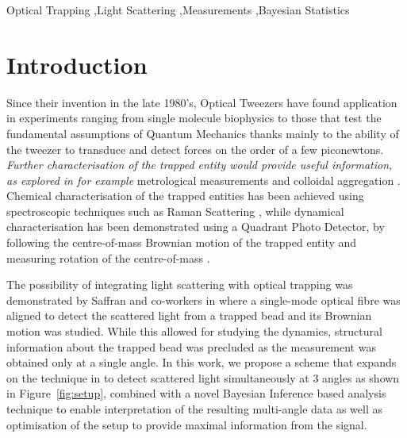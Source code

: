 \documentclass[final, 3p]{elsarticle}
\begin{document}
\begin{frontmatter}
\begin{keyword}
	Optical Trapping \sep Light Scattering \sep Measurements \sep Bayesian Statistics 
\end{keyword}

\end{frontmatter}





\section{Introduction}
\label{sec:Intro}

Since their invention in the late 1980's, Optical Tweezers have found application in experiments ranging from single molecule biophysics \cite{Bustamante2021Biophysics} to those that test the fundamental assumptions of Quantum Mechanics  \cite{yin2013large} thanks mainly to the ability of the tweezer to transduce and detect forces on the order of a few piconewtons. \textit{Further characterisation of the trapped entity would provide useful information, as explored in for example} metrological measurements \cite{arita2020coherent} and colloidal aggregation \cite{burns1990optical}. Chemical characterisation of the trapped entities has been achieved using spectroscopic techniques such as Raman Scattering \cite{gupta2014raman}, while dynamical characterisation has been demonstrated using a Quadrant Photo Detector,  by following the centre-of-mass Brownian motion of the trapped entity  \cite{friedrich2012tuning} and measuring rotation  of the centre-of-mass \cite{yifat2021facile}. 

The possibility of integrating light scattering with optical trapping
was demonstrated by Saffran and co-workers in \cite{Bar-Ziv_1998}
where a single-mode optical fibre was aligned to detect the scattered
light from a trapped bead and its Brownian motion was studied.  While
this allowed for studying the dynamics, structural information about
the trapped bead was precluded as the measurement was obtained only at
a single angle.  In this work, we propose a scheme that expands on the
technique in \cite{Bar-Ziv_1998} to detect scattered light
simultaneously at 3 angles as shown in Figure~\ref{fig:setup},
combined with a novel Bayesian Inference based analysis technique to
enable interpretation of the resulting multi-angle data as well as
optimisation of the setup to provide maximal information from the
signal.
\end{document}
